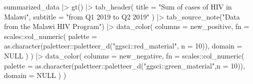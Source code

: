 \documentclass[
]{article}
\newenvironment{Shaded}{\begin{snugshade}}{\end{snugshade}}
\newcommand{\AttributeTok}[1]{\textcolor[rgb]{0.77,0.63,0.00}{#1}}
\newcommand{\ConstantTok}[1]{\textcolor[rgb]{0.00,0.00,0.00}{#1}}
\newcommand{\DecValTok}[1]{\textcolor[rgb]{0.00,0.00,0.81}{#1}}
\newcommand{\FunctionTok}[1]{\textcolor[rgb]{0.00,0.00,0.00}{#1}}
\newcommand{\NormalTok}[1]{#1}
\newcommand{\SpecialCharTok}[1]{\textcolor[rgb]{0.00,0.00,0.00}{#1}}
\newcommand{\StringTok}[1]{\textcolor[rgb]{0.31,0.60,0.02}{#1}}
\begin{document}
\begin{Shaded}
\begin{Highlighting}[]
\NormalTok{summarized\_data }\SpecialCharTok{|\textgreater{}} 
  \FunctionTok{gt}\NormalTok{() }\SpecialCharTok{|\textgreater{}} 
  \FunctionTok{tab\_header}\NormalTok{(}
    \AttributeTok{title =} \StringTok{"Sum of cases of HIV in Malawi"}\NormalTok{,}
    \AttributeTok{subtitle =} \StringTok{"from Q1 2019 to Q2 2019"}
\NormalTok{  ) }\SpecialCharTok{|\textgreater{}} 
  \FunctionTok{tab\_source\_note}\NormalTok{(}\StringTok{"Data from the Malawi HIV Program"}\NormalTok{) }\SpecialCharTok{|\textgreater{}} 
  \FunctionTok{data\_color}\NormalTok{(}
    \AttributeTok{columns =}\NormalTok{ new\_positive,}
    \AttributeTok{fn =}\NormalTok{ scales}\SpecialCharTok{::}\FunctionTok{col\_numeric}\NormalTok{(}
      \AttributeTok{palette =} \FunctionTok{as.character}\NormalTok{(paletteer}\SpecialCharTok{::}\FunctionTok{paletteer\_d}\NormalTok{(}\StringTok{"ggsci::red\_material"}\NormalTok{, }\AttributeTok{n =} \DecValTok{10}\NormalTok{)),}
      \AttributeTok{domain =} \ConstantTok{NULL}
\NormalTok{    )}
\NormalTok{  ) }\SpecialCharTok{|\textgreater{}} 
  \FunctionTok{data\_color}\NormalTok{(}
    \AttributeTok{columns =}\NormalTok{ new\_negative,}
    \AttributeTok{fn =}\NormalTok{ scales}\SpecialCharTok{::}\FunctionTok{col\_numeric}\NormalTok{(}
      \AttributeTok{palette =} \FunctionTok{as.character}\NormalTok{(paletteer}\SpecialCharTok{::}\FunctionTok{paletteer\_d}\NormalTok{(}\StringTok{"ggsci::green\_material"}\NormalTok{,}\AttributeTok{n =} \DecValTok{10}\NormalTok{)),}
      \AttributeTok{domain =} \ConstantTok{NULL}
\NormalTok{    )}
\NormalTok{  ) }
\end{Highlighting}
\end{Shaded}
\end{document}
